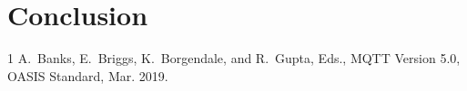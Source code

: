 \documentclass[journal]{IEEEtran}
\begin{document}
\section{Conclusion}
\label{sec:conclusion}

\begin{thebibliography}{1}
A.~Banks, E.~Briggs, K.~Borgendale, and R.~Gupta, Eds.,
MQTT Version 5.0, OASIS Standard, Mar. 2019.
\end{thebibliography}
\end{document}
